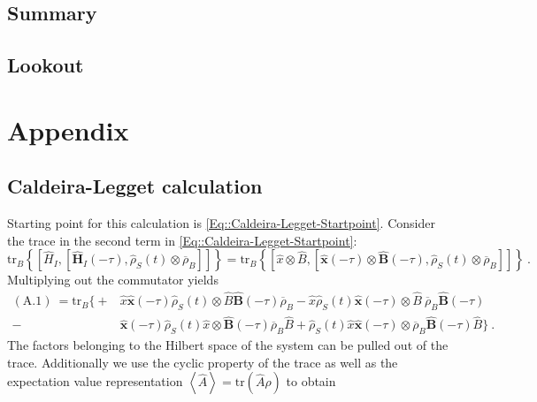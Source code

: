 	\section{Summary}
	\section{Lookout}
	
	
	\appendix
	\chapter{Appendix}
	\section{Caldeira-Legget calculation} \label{Section::Appendix-Caldeira-Legget}
	Starting point for this calculation is \autoref{Eq::Caldeira-Legget-Startpoint}. Consider the trace in the second term in \autoref{Eq::Caldeira-Legget-Startpoint}:
	\begin{equation}
		\text{tr}_B \left\{  \left[{\hat{H}}_I, \left[{\boldsymbol{\hat{H}}}_I(- \tau), {\hat{\rho}}_S(t) \otimes \overline{\rho}_B \right]\right]  \right\} =	\text{tr}_B \left\{  \left[\hat{x} \otimes \hat{B}, \left[{\boldsymbol{\hat{x}}}(- \tau) \otimes \boldsymbol{\hat{B}}(- \tau), {\hat{\rho}}_S(t) \otimes \overline{\rho}_B \right]\right]  \right\}~.
	\end{equation}
	Multiplying out the commutator yields
	\begin{equation} \label{Eq::Caldeira-Leggett-Trace}
		\begin{split}
			(\text{A.1})~=\text{tr}_B \bigg \{+&\hat{x} \boldsymbol{\hat{x}}(-\tau) \hat{\rho}_S(t) \otimes \hat{B} \boldsymbol{\hat{B}}(-\tau) \overline{\rho}_B
			- \hat{x}  \hat{\rho}_S(t) \boldsymbol{\hat{x}}(-\tau) \otimes \hat{B}  ~\overline{\rho}_B \boldsymbol{\hat{B}}(-\tau)\\
			-&  \boldsymbol{\hat{x}}(-\tau) \hat{\rho}_S(t) \hat{x} \otimes  	\boldsymbol{\hat{B}}(-\tau) \overline{\rho}_B \hat{B}
			+ \hat{\rho}_S(t) \hat{x} \boldsymbol{\hat{x}}(-\tau)  \otimes \overline{\rho}_B \boldsymbol{\hat{B}}(-\tau) \hat{B}   \bigg \}~.
		\end{split}
	\end{equation}
	The factors belonging to the Hilbert space of the system can be pulled out of the trace. Additionally we use the cyclic property of the trace as well as the expectation value representation $\left \langle \hat{A} \right \rangle =	\text{tr}\left(\hat{A}\rho\right)$ to obtain
